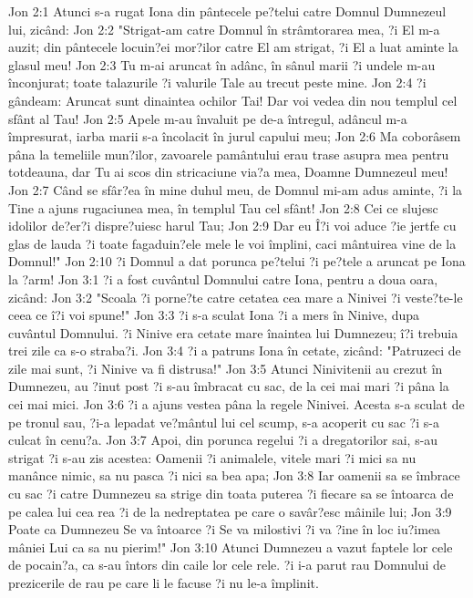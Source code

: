 Jon 2:1  Atunci s-a rugat Iona din pântecele pe?telui catre Domnul Dumnezeul lui, zicând:
Jon 2:2  "Strigat-am catre Domnul în strâmtorarea mea, ?i El m-a auzit; din pântecele locuin?ei mor?ilor catre El am strigat, ?i El a luat aminte la glasul meu!
Jon 2:3  Tu m-ai aruncat în adânc, în sânul marii ?i undele m-au înconjurat; toate talazurile ?i valurile Tale au trecut peste mine.
Jon 2:4  ?i gândeam: Aruncat sunt dinaintea ochilor Tai! Dar voi vedea din nou templul cel sfânt al Tau!
Jon 2:5  Apele m-au învaluit pe de-a întregul, adâncul m-a împresurat, iarba marii s-a încolacit în jurul capului meu;
Jon 2:6  Ma coborâsem pâna la temeliile mun?ilor, zavoarele pamântului erau trase asupra mea pentru totdeauna, dar Tu ai scos din stricaciune via?a mea, Doamne Dumnezeul meu!
Jon 2:7  Când se sfâr?ea în mine duhul meu, de Domnul mi-am adus aminte, ?i la Tine a ajuns rugaciunea mea, în templul Tau cel sfânt!
Jon 2:8  Cei ce slujesc idolilor de?er?i dispre?uiesc harul Tau;
Jon 2:9  Dar eu Î?i voi aduce ?ie jertfe cu glas de lauda ?i toate fagaduin?ele mele le voi împlini, caci mântuirea vine de la Domnul!"
Jon 2:10  ?i Domnul a dat porunca pe?telui ?i pe?tele a aruncat pe Iona la ?arm!
Jon 3:1  ?i a fost cuvântul Domnului catre Iona, pentru a doua oara, zicând:
Jon 3:2  "Scoala ?i porne?te catre cetatea cea mare a Ninivei ?i veste?te-le ceea ce î?i voi spune!"
Jon 3:3  ?i s-a sculat Iona ?i a mers în Ninive, dupa cuvântul Domnului. ?i Ninive era cetate mare înaintea lui Dumnezeu; î?i trebuia trei zile ca s-o straba?i.
Jon 3:4  ?i a patruns Iona în cetate, zicând: "Patruzeci de zile mai sunt, ?i Ninive va fi distrusa!"
Jon 3:5  Atunci Ninivitenii au crezut în Dumnezeu, au ?inut post ?i s-au îmbracat cu sac, de la cei mai mari ?i pâna la cei mai mici.
Jon 3:6  ?i a ajuns vestea pâna la regele Ninivei. Acesta s-a sculat de pe tronul sau, ?i-a lepadat ve?mântul lui cel scump, s-a acoperit cu sac ?i s-a culcat în cenu?a.
Jon 3:7  Apoi, din porunca regelui ?i a dregatorilor sai, s-au strigat ?i s-au zis acestea: Oamenii ?i animalele, vitele mari ?i mici sa nu manânce nimic, sa nu pasca ?i nici sa bea apa;
Jon 3:8  Iar oamenii sa se îmbrace cu sac ?i catre Dumnezeu sa strige din toata puterea ?i fiecare sa se întoarca de pe calea lui cea rea ?i de la nedreptatea pe care o savâr?esc mâinile lui;
Jon 3:9  Poate ca Dumnezeu Se va întoarce ?i Se va milostivi ?i va ?ine în loc iu?imea mâniei Lui ca sa nu pierim!"
Jon 3:10  Atunci Dumnezeu a vazut faptele lor cele de pocain?a, ca s-au întors din caile lor cele rele. ?i i-a parut rau Domnului de prezicerile de rau pe care li le facuse ?i nu le-a împlinit.
